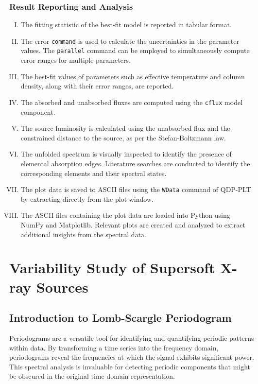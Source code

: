 			\subsubsection{Result Reporting and Analysis}
				\begin{enumerate}[I.]
					\item The fitting statistic of the best-fit model is reported in tabular format.
					\item The error \texttt{command} is used to calculate the uncertainties in the parameter values. The \texttt{parallel} command can be employed to simultaneously compute error ranges for multiple parameters.
					\item The best-fit values of parameters such as effective temperature and column density, along with their error ranges, are reported.
					\item The absorbed and unabsorbed fluxes are computed using the \texttt{cflux} model component.
					\item The source luminosity is calculated using the unabsorbed flux and the constrained distance to the source, as per the Stefan-Boltzmann law.
					\item The unfolded spectrum is visually inspected to identify the presence of elemental absorption edges. Literature searches are conducted to identify the corresponding elements and their spectral states.
					\item The plot data is saved to ASCII files using the \texttt{WData} command of QDP-PLT by extracting directly from the plot window.
					\item The ASCII files containing the plot data are loaded into Python using NumPy and Matplotlib. Relevant plots are created and analyzed to extract additional insights from the spectral data.
				\end{enumerate}
			

    \section{Variability Study of Supersoft X-ray Sources} \label{methodology:variability}
    
    	\subsection{Introduction to Lomb-Scargle Periodogram}
    		Periodograms are a versatile tool for identifying and quantifying periodic patterns within data. By transforming a time series into the frequency domain, periodograms reveal the frequencies at which the signal exhibits significant power. This spectral analysis is invaluable for detecting periodic components that might be obscured in the original time domain representation.
    		
